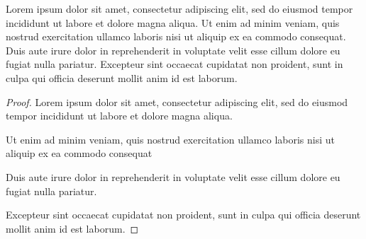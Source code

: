 \documentclass[12pt, a4paper, oneside]{amsart}
\begin{document}
Lorem ipsum dolor sit amet, consectetur adipiscing elit, sed do eiusmod tempor incididunt ut labore et dolore magna aliqua. Ut enim ad minim veniam, quis nostrud exercitation ullamco laboris nisi ut aliquip ex ea commodo consequat. Duis aute irure dolor in reprehenderit in voluptate velit esse cillum dolore eu fugiat nulla pariatur. Excepteur sint occaecat cupidatat non proident, sunt in culpa qui officia deserunt mollit anim id est laborum.

\begin{proof}
Lorem ipsum dolor sit amet, consectetur adipiscing elit, sed do eiusmod tempor incididunt ut labore et dolore magna aliqua.

Ut enim ad minim veniam, quis nostrud exercitation ullamco laboris nisi ut aliquip ex ea commodo consequat

Duis aute irure dolor in reprehenderit in voluptate velit esse cillum dolore eu fugiat nulla pariatur.

Excepteur sint occaecat cupidatat non proident, sunt in culpa qui officia deserunt mollit anim id est laborum.
\end{proof}

\end{document}
